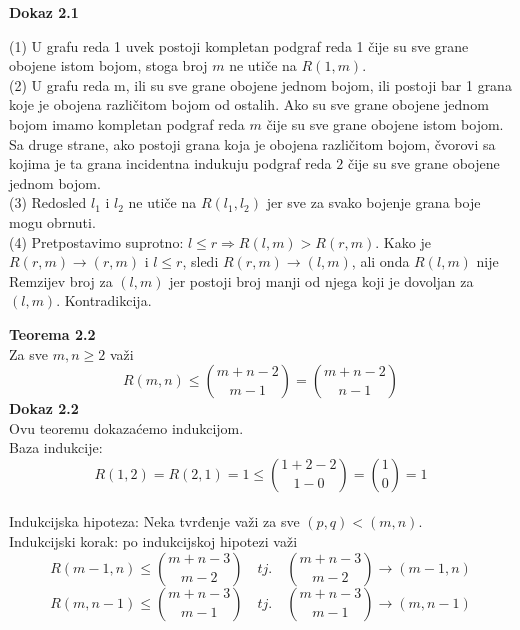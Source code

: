 \documentclass[12pt,a4paper]{article}
\begin{document}
	{\noindent\fontsize{12pt}{12pt}\textbf{Dokaz 2.1}}
	
	\vspace{0.5em}
	
	\noindent(1) {} {} U grafu reda 1 uvek postoji kompletan podgraf reda 1 čije su sve grane obojene istom bojom, stoga broj $m$ ne utiče na $R(1, m)$.
	\vspace{0.5em} 	\\
	\noindent(2) {} {} U grafu reda m, ili su sve grane obojene jednom bojom, ili postoji bar 1 grana koje je obojena različitom bojom od ostalih. Ako su sve grane obojene jednom bojom imamo kompletan podgraf reda $m$ čije su sve grane obojene istom bojom. Sa druge strane, ako postoji grana koja je obojena različitom bojom, čvorovi sa kojima je ta grana incidentna indukuju podgraf reda $2$ čije su sve grane obojene jednom bojom.
	\vspace{0.5em} \\
	\noindent(3) {} {} Redosled $l_{1}$ i $l_{2}$ ne utiče na $R(l_{1}, l_{2})$ jer sve za svako bojenje grana boje mogu obrnuti.
	\vspace{0.5em} \\
	\noindent(4) {} {} Pretpostavimo suprotno: $l \leq r \Rightarrow R(l, m) > R(r, m)$. Kako je $R(r, m) \rightarrow (r,m)$ i  $l \leq r$, sledi $R(r, m) \rightarrow (l, m)$, ali onda $R(l, m)$ nije Remzijev broj za $(l,m)$ jer postoji broj manji od njega koji je dovoljan za $(l, m)$. Kontradikcija.
	\vspace{1.5em}
	
	{\noindent\fontsize{12pt}{12pt}\textbf{Teorema 2.2}}
	\vspace{0.5em}	
	\\
	Za sve $m,n \geq 2$ važi
	\[R(m,n) \leq {m+n-2\choose m-1} = {m+n-2\choose n-1}\]
	\vspace{1em}
	{\noindent\fontsize{12pt}{12pt}\textbf{Dokaz 2.2}}	\vspace{-0.5em}
	\\
	\noindent Ovu teoremu dokazaćemo indukcijom.\\
	Baza indukcije:\\
	\[R(1,2) = R(2,1) = 1 \leq {1+2-2\choose 1-0}={1\choose 0}=1\]\\
	Indukcijska hipoteza:
	Neka tvrđenje važi za sve $(p,q)<(m,n)$.\\
	Indukcijski korak: po indukcijskoj hipotezi važi 
	\[R(m-1, n) \leq {m+n-3\choose m-2} \quad tj. \quad {m+n-3\choose m-2}\rightarrow (m-1, n)\] 
	\[R(m, n-1) \leq {m+n-3\choose m-1} \quad tj. \quad {m+n-3\choose m-1}\rightarrow (m, n-1)\]
	
\end{document}
